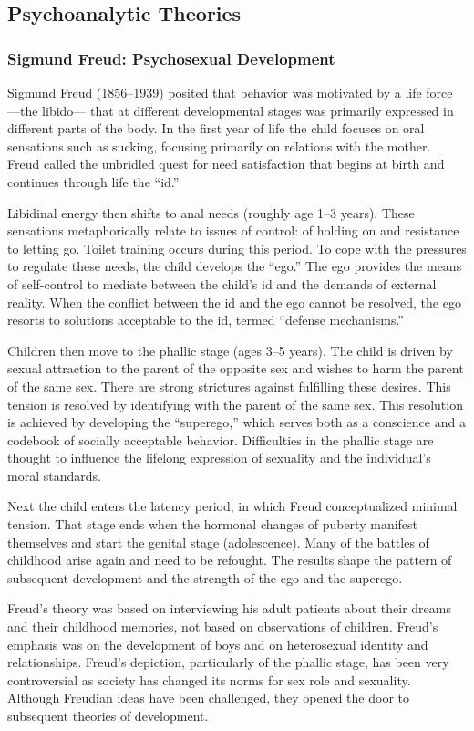 \subsection{Psychoanalytic Theories}
\subsubsection{Sigmund Freud: Psychosexual Development}
Sigmund Freud (1856–1939) posited that behavior was motivated by a life force
—the libido— that at different developmental stages was primarily expressed in
different parts of the body. In the first year of life the child focuses on
oral sensations such as sucking, focusing primarily on relations with the
mother. Freud called the unbridled quest for need satisfaction that begins at
birth and continues through life the “id.” \cite{Feldman3}

Libidinal energy then shifts to anal needs (roughly age 1–3 years). These
sensations metaphorically relate to issues of control: of holding on and
resistance to letting go. Toilet training occurs during this period. To cope
with the pressures to regulate these needs, the child develops the “ego.” The
ego provides the means of self-control to mediate between the child’s id and
the demands of external reality. When the conflict between the id and the ego
cannot be resolved, the ego resorts to solutions acceptable to the id, termed
“defense mechanisms.” \cite{Feldman3}

Children then move to the phallic stage (ages 3–5 years). The child is driven
by sexual attraction to the parent of the opposite sex and wishes to harm the
parent of the same sex. There are strong strictures against fulfilling these
desires. This tension is resolved by identifying with the parent of the same
sex. This resolution is achieved by developing the “superego,” which serves
both as a conscience and a codebook of socially acceptable behavior.
Difficulties in the phallic stage are thought to influence the lifelong
expression of sexuality and the individual’s moral standards. \cite{Feldman3}

Next the child enters the latency period, in which Freud conceptualized minimal
tension. That stage ends when the hormonal changes of puberty manifest
themselves and start the genital stage (adolescence). Many of the battles of
childhood arise again and need to be refought. The results shape the pattern of
subsequent development and the strength of the ego and the superego.
\cite{Feldman3}

Freud’s theory was based on interviewing his adult patients about their dreams
and their childhood memories, not based on observations of children. Freud’s
emphasis was on the development of boys and on heterosexual identity and
relationships. Freud’s depiction, particularly of the phallic stage, has been
very controversial as society has changed its norms for sex role and sexuality.
\cite{Feldman3} Although Freudian ideas have been challenged, they opened the
door to subsequent theories of development. \cite{Nelson19}

